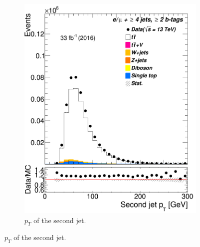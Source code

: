 \begin{figure} [t]
\begin{subfigure}{0.25\textwidth}
		\includegraphics[width=\linewidth]{ControlPlots_emujets_2016_4incl_2incl/jet1_pt_emujets_2016.png}
		\caption{$p_T$ of the second jet.} \label{fig:Sec22}	
	\end{subfigure}
	
	
	

\end{figure}
